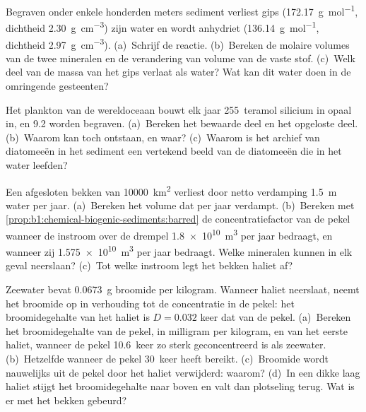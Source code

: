 \begin{exercise}[$\star\star$]\label{exo:b1:chemical-biogenic-sediments:8}
Begraven onder enkele honderden meters sediment verliest gips  (\qty{172.17}{g.mol^{-1}}, dichtheid \qty{2.30}{g.cm^{-3}}) zijn water en wordt anhydriet  (\qty{136.14}{g.mol^{-1}}, dichtheid \qty{2.97}{g.cm^{-3}}). (a)~Schrijf de reactie. (b)~Bereken de molaire volumes van de twee mineralen en de verandering van volume van de vaste stof. (c)~Welk deel van de massa van het gips verlaat als water? Wat kan dit water doen in de omringende gesteenten?
\end{exercise}

\begin{exercise}[$\star\star$]\label{exo:b1:chemical-biogenic-sediments:9}
Het plankton van de wereldoceaan bouwt elk jaar 255~teramol silicium in opaal in, en 9.2 worden begraven. (a)~Bereken het bewaarde deel en het opgeloste deel. (b)~Waarom kan  toch ontstaan, en waar? (c)~Waarom is het archief van diatomeeën in het sediment een vertekend beeld van de diatomeeën die in het water leefden?
\end{exercise}

\begin{exercise}[$\star\star\star$]\label{exo:b1:chemical-biogenic-sediments:10}
Een afgesloten bekken van \qty{10000}{km^2} verliest door netto verdamping \qty{1.5}{m} water per jaar. (a)~Bereken het volume dat per jaar verdampt. (b)~Bereken met \cref{prop:b1:chemical-biogenic-sediments:barred} de concentratiefactor van de pekel wanneer de instroom over de drempel \qty{1.8e10}{m^3} per jaar bedraagt, en wanneer zij \qty{1.575e10}{m^3} per jaar bedraagt. Welke mineralen kunnen in elk geval neerslaan? (c)~Tot welke instroom legt het bekken haliet af?
\end{exercise}

\begin{exercise}[$\star\star\star$]\label{exo:b1:chemical-biogenic-sediments:11}
Zeewater bevat \qty{0.0673}{g} broomide per kilogram. Wanneer haliet neerslaat, neemt het broomide op in verhouding tot de concentratie in de pekel: het broomidegehalte van het haliet is $D = 0.032$ keer dat van de pekel. (a)~Bereken het broomidegehalte van de pekel, in milligram per kilogram, en van het eerste haliet, wanneer de pekel 10.6~keer zo sterk geconcentreerd is als zeewater. (b)~Hetzelfde wanneer de pekel 30~keer heeft bereikt. (c)~Broomide wordt nauwelijks uit de pekel door het haliet verwijderd: waarom? (d)~In een dikke laag haliet stijgt het broomidegehalte naar boven en valt dan plotseling terug. Wat is er met het bekken gebeurd?
\end{exercise}

